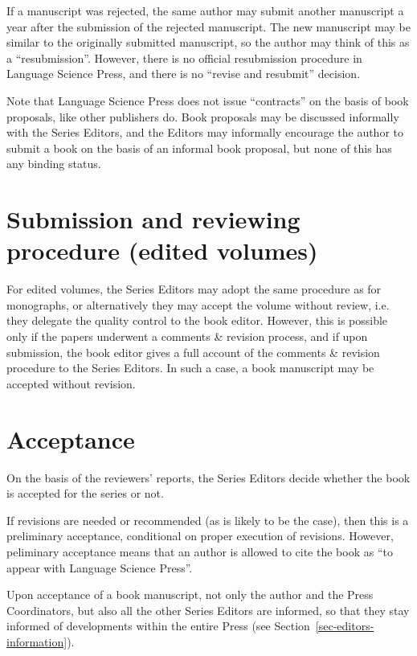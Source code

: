 \documentclass[ number=??
                ,series=lnls,
                ,isbn=000-0-000000-00-0,
                ,url=http://langsci-press.org/catalog/book/0,
	        ,output=long    %
	        ,draftmode  
		  ]{LSP/langsci}
\begin{document}
If a manuscript was rejected, the same author may submit another manuscript a year after the
submission of the rejected manuscript. The new manuscript may be similar to the originally submitted
manuscript, so the author may think of this as a ``resubmission''. However, there is no official
resubmission procedure in Language Science Press, and there is no ``revise and resubmit'' decision.

Note that Language Science Press does not issue ``contracts'' on the basis of book proposals, like
other publishers do. Book proposals may be discussed informally with the Series Editors, and the
Editors may informally encourage the author to submit a book on the basis of an informal book
proposal, but none of this has any binding status.

\section{Submission and reviewing procedure (edited volumes)}

For edited volumes, the Series Editors may adopt the same procedure as for monographs, or
alternatively they may accept the volume without review, i.e. they delegate the quality control to
the book editor. However, this is possible only if the papers underwent a comments \& revision
process, and if upon submission, the book editor gives a full account of the comments \& revision
procedure to the Series Editors. In such a case, a book manuscript may be accepted without revision.

\section{Acceptance}

On the basis of the reviewers' reports, the Series Editors decide whether the book is accepted for
the series or not.

If revisions are needed or recommended (as is likely to be the case), then this is a preliminary
acceptance, conditional on proper execution of revisions. However, peliminary acceptance means that
an author is allowed to cite the book as ``to appear with Language Science Press''.

Upon acceptance of a book manuscript, not only the author and the Press Coordinators, but also all
the other Series Editors are informed, so that they stay informed of developments within the entire
Press (see Section~\ref{sec-editors-information}).
\end{document}
